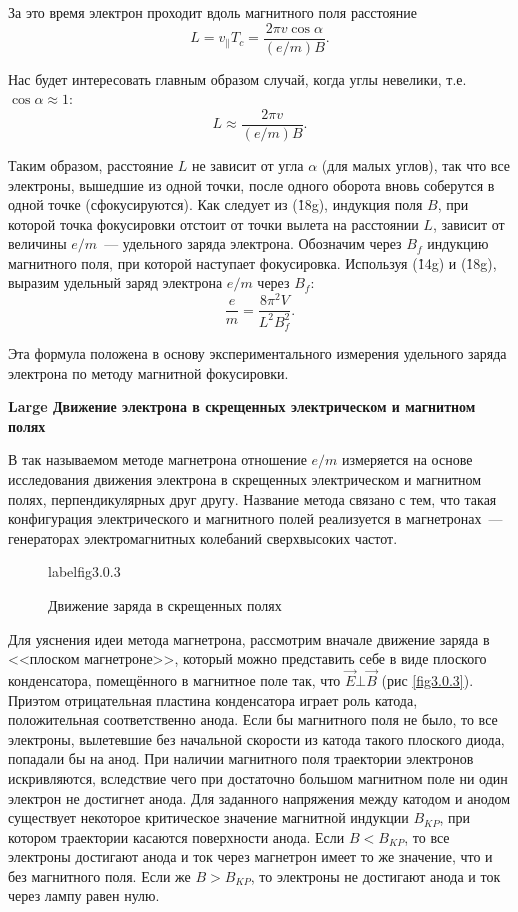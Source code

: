 \documentclass[a4paper,10pt,twoside]{article}
\begin{document}
За это время электрон проходит вдоль магнитного поля расстояние
\begin{equation}
L = v_{\parallel}T_c =\frac{2\pi v\cos\alpha}{(e/m)B}.
\end{equation}

Нас будет интересовать главным образом случай, когда углы невелики, т.е. $\cos\alpha \approx 1$:
\begin{equation}
L \approx \frac{2\pi v}{(e/m)B}.
\end{equation}

Таким образом, расстояние $L$ не зависит от угла $\alpha$ (для малых углов), так что все электроны, вышедшие из одной точки, после одного оборота вновь соберутся в одной точке (сфокусируются). Как следует из (\r{18g}), индукция поля $B$, при которой точка фокусировки отстоит от точки вылета на расстоянии $L$, зависит от величины $e/m$~--- удельного заряда электрона. Обозначим через $B_f$ индукцию магнитного поля, при которой наступает фокусировка. Используя (\r{14g}) и (\r{18g}), выразим удельный заряд электрона $e/m$ через $B_f$:
\begin{equation}
\frac{e}{m}=\frac{8\pi^2 V}{L^2B_f^2}.
\end{equation}

Эта формула положена в основу экспериментального измерения удельного заряда электрона по \textsf{методу магнитной
фокусировки}.

{\bf Large Движение электрона в скрещенных электрическом и магнитном полях}

В так называемом {\textsf{методе магнетрона}} отношение $e/m$ измеряется на основе исследования движения электрона в скрещенных электрическом и магнитном полях, перпендикулярных друг другу. Название метода связано с тем, что такая
конфигурация электрического и магнитного полей реализуется в магнетронах~--- генераторах электромагнитных колебаний
сверхвысоких частот.

\begin{figure}
\caption{Движение заряда в скрещенных полях}
label{fig3.0.3}
\end{figure}

Для уяснения идеи метода магнетрона, рассмотрим вначале движение заряда в <<плоском магнетроне>>, который можно
представить себе в виде плоского конденсатора, помещённого в магнитное поле так, что $\vec{E}\bot\vec{B}$ (рис \ref{fig3.0.3}). Приэтом отрицательная пластина конденсатора играет роль катода, положительная соответственно анода. Если бы магнитного поля не было, то все электроны, вылетевшие без начальной скорости из катода такого плоского диода, попадали бы на анод. При наличии магнитного поля траектории электронов искривляются, вследствие чего при достаточно большом магнитном поле ни один электрон не достигнет анода. Для заданного напряжения между катодом и анодом существует некоторое критическое значение магнитной индукции $B_{KP}$, при котором траектории касаются поверхности анода. Если $B<B_{KP}$, то все электроны достигают анода и ток через магнетрон имеет то же значение, что и без магнитного поля. Если же $B>B_{KP}$, то электроны не достигают анода и ток через лампу равен нулю.
\end{document}
